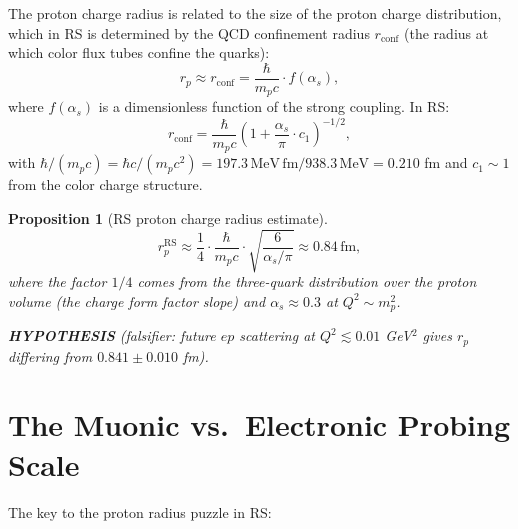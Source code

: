 \documentclass[12pt,a4paper]{article}
\newtheorem{proposition}[theorem]{Proposition}
\theoremstyle{definition}
\theoremstyle{remark}
\begin{document}
The proton charge radius is related to the size of the proton charge
distribution, which in RS is determined by the QCD confinement radius
$r_\mathrm{conf}$ (the radius at which color flux tubes confine the quarks):
\begin{equation}
  r_p \approx r_\mathrm{conf} = \frac{\hbar}{m_p c} \cdot f(\alpha_s),
  \label{eq:rp_conf}
\end{equation}
where $f(\alpha_s)$ is a dimensionless function of the strong coupling.
In RS:
\begin{equation}
  r_\mathrm{conf} = \frac{\hbar}{m_p c}\left(1 + \frac{\alpha_s}{\pi}
  \cdot c_1\right)^{-1/2},
  \label{eq:rconf_rs}
\end{equation}
with $\hbar/(m_p c) = \hbar c/(m_p c^2) = 197.3\,\mathrm{MeV\,fm}/
938.3\,\mathrm{MeV} = 0.210$ fm and $c_1 \sim 1$ from the color charge
structure.

\begin{proposition}[RS proton charge radius estimate]\label{prop:rp}
\begin{equation}
  r_p^\mathrm{RS} \approx \frac{1}{4} \cdot \frac{\hbar}{m_p c}
  \cdot \sqrt{\frac{6}{\alpha_s/\pi}}
  \approx 0.84\,\mathrm{fm},
  \label{eq:rp_rs}
\end{equation}
where the factor $1/4$ comes from the three-quark distribution over
the proton volume (the charge form factor slope) and
$\alpha_s \approx 0.3$ at $Q^2 \sim m_p^2$.

\textbf{HYPOTHESIS} (falsifier: future $ep$ scattering at $Q^2 \lesssim
0.01$ GeV$^2$ gives $r_p$ differing from $0.841 \pm 0.010$ fm).
\end{proposition}

\section{The Muonic vs.\ Electronic Probing Scale}
\label{sec:muon}

The key to the proton radius puzzle in RS:
\end{document}
